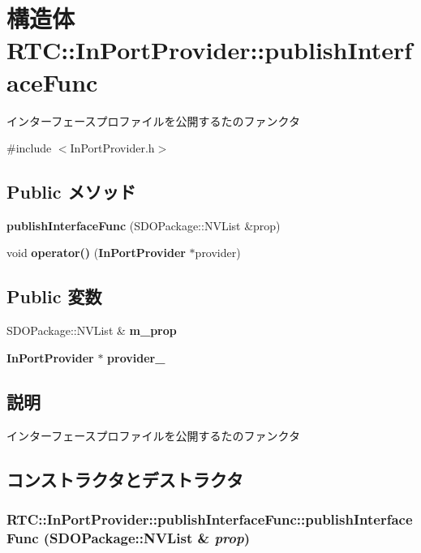 \section{構造体 RTC::InPortProvider::publishInterfaceFunc}
\label{structRTC_1_1InPortProvider_1_1publishInterfaceFunc}


インターフェースプロファイルを公開するたのファンクタ  




{\ttfamily \#include $<$InPortProvider.h$>$}

\subsection*{Public メソッド}
\begin{DoxyCompactItemize}
\item 
{\bf publishInterfaceFunc} (SDOPackage::NVList \&prop)
\item 
void {\bf operator()} ({\bf InPortProvider} $\ast$provider)
\end{DoxyCompactItemize}
\subsection*{Public 変数}
\begin{DoxyCompactItemize}
\item 
SDOPackage::NVList \& {\bf m\_\-prop}
\item 
{\bf InPortProvider} $\ast$ {\bf provider\_\-}
\end{DoxyCompactItemize}


\subsection{説明}
インターフェースプロファイルを公開するたのファンクタ 

\subsection{コンストラクタとデストラクタ}
\subsubsection[{publishInterfaceFunc}]{\setlength{\rightskip}{0pt plus 5cm}RTC::InPortProvider::publishInterfaceFunc::publishInterfaceFunc (SDOPackage::NVList \& {\em prop})\hspace{0.3cm}{\ttfamily  [inline]}}\label{structRTC_1_1InPortProvider_1_1publishInterfaceFunc_a0aaf2ad60678f28f706ea8ffa3fb2c28}


